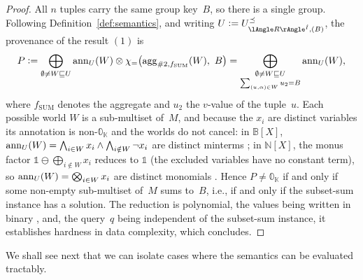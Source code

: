 \begin{proof}
  All $n$ tuples carry the same group key~$B$, so there is a single group.
  Following Definition~\ref{def:semantics}, and writing
  $U\defeq U^{\preceq}_{\angsem{\hat I}{R},(B)}$, the provenance of the
  result $(1)$ is
\[
   P\mathrel{\mathop:}=\bigoplus_{\emptyset\neq W\sqsubseteq U}
  \mathrm{ann}_U(W)\otimes
  \chi_{=}\bigl(\mathrm{agg}_{\#2,f_{\mathrm{SUM}}}(W),\ B\bigr)
=
\bigoplus_{\substack{\emptyset\neq W\sqsubseteq U\\ \sum_{(u,\alpha)\in W} u_2=B}}
\mathrm{ann}_U(W),
\]
where $f_{\mathrm{SUM}}$ denotes the  aggregate and $u_2$ the
$v$-value of the tuple~$u$. Each possible world
$W$ is a sub-multiset of~$M$, and because the $x_i$ are distinct variables its
annotation is non-$\mathbb{0}_\mathbb{K}$ and the worlds do not cancel: in
$\mathbb{B}[X]$, $\mathrm{ann}_U(W)=\bigwedge_{i\in W}x_i\wedge\bigwedge_{i\notin
W}\lnot x_i$ are distinct minterms
; in
$\mathbb{N}[X]$, the monus factor
$\mathbb{1}\ominus\bigoplus_{i\notin W}x_i$ reduces to $\mathbb{1}$ (the
excluded variables have no constant term), so $\mathrm{ann}_U(W)=\bigotimes_{i\in
W}x_i$ are distinct monomials
. Hence $P\neq\mathbb{0}_\mathbb{K}$ if and only
if some non-empty sub-multiset of~$M$ sums to~$B$, i.e., if and only if the
subset-sum instance has a solution. The reduction is polynomial, the
values being written in binary
%
,
and, the
query~$q$ being independent of the subset-sum instance, it establishes
hardness in data complexity, which concludes.
\end{proof}

We shall see next that we can isolate cases where the
semantics can be evaluated tractably.
